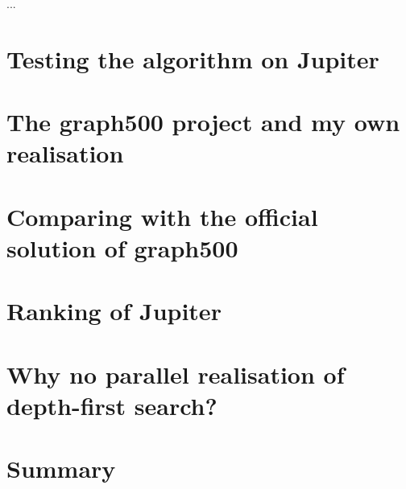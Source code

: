 \documentclass[11pt,a4paper]{article}
\begin{document}
...

\section{Testing the algorithm on Jupiter}
\label{sec:testing}


\section{The graph500 project and my own realisation}
\label{sec:graph500}

\section{Comparing with the official solution of graph500}
\label{sec:Comparing}

\section{Ranking of Jupiter}
\label{sec:ranking}

\section{Why no parallel realisation of depth-first search?}
\label{sec:depth-first search}

\section{Summary}
\label{sec:summary}

\clearpage



\end{document}
